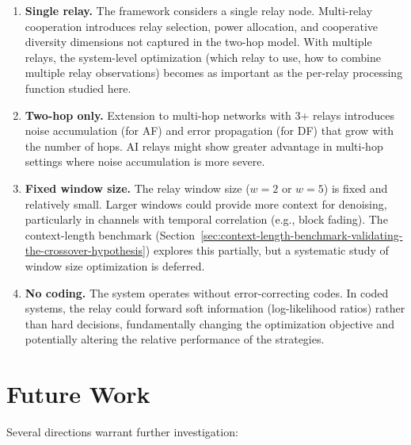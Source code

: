 \begin{enumerate}
\item
  \textbf{Single relay.} The framework considers a single relay node. Multi-relay cooperation introduces relay selection, power allocation, and cooperative diversity dimensions not captured in the two-hop model. With multiple relays, the system-level optimization (which relay to use, how to combine multiple relay observations) becomes as important as the per-relay processing function studied here.
\item
  \textbf{Two-hop only.} Extension to multi-hop networks with 3+ relays introduces noise accumulation (for AF) and error propagation (for DF) that grow with the number of hops. AI relays might show greater advantage in multi-hop settings where noise accumulation is more severe.
\item
  \textbf{Fixed window size.} The relay window size (\(w = 2\) or \(w = 5\)) is fixed and relatively small. Larger windows could provide more context for denoising, particularly in channels with temporal correlation (e.g., block fading). The context-length benchmark (Section~\ref{sec:context-length-benchmark-validating-the-crossover-hypothesis}) explores this partially, but a systematic study of window size optimization is deferred.
\item
  \textbf{No coding.} The system operates without error-correcting codes. In coded systems, the relay could forward soft information (log-likelihood ratios) rather than hard decisions, fundamentally changing the optimization objective and potentially altering the relative performance of the strategies.
\end{enumerate}

\section{Future Work}\label{sec:future-work}

Several directions warrant further investigation:

